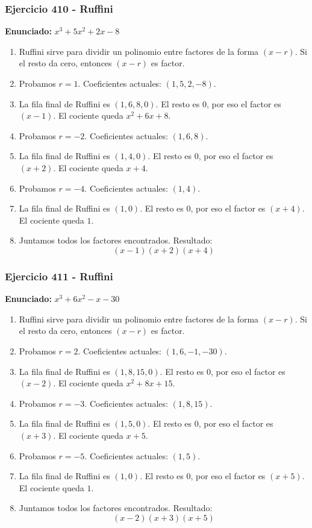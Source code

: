 \documentclass[11pt,a4paper]{article}
\begin{document}
\vspace{0.2cm}
\subsubsection*{Ejercicio 410 - Ruffini}
\textbf{Enunciado:} $ x^{3} + 5 x^{2} + 2 x - 8 $\par
\begin{enumerate}[leftmargin=2em]
\item Ruffini sirve para dividir un polinomio entre factores de la forma \((x-r)\). Si el resto da cero, entonces \((x-r)\) es factor.
\item Probamos \(r=1\). Coeficientes actuales: \((1, 5, 2, -8)\).
\item La fila final de Ruffini es \((1, 6, 8, 0)\). El resto es \(0\), por eso el factor es \((x-1)\). El cociente queda \(x^{2} + 6 x + 8\).
\item Probamos \(r=-2\). Coeficientes actuales: \((1, 6, 8)\).
\item La fila final de Ruffini es \((1, 4, 0)\). El resto es \(0\), por eso el factor es \((x+2)\). El cociente queda \(x + 4\).
\item Probamos \(r=-4\). Coeficientes actuales: \((1, 4)\).
\item La fila final de Ruffini es \((1, 0)\). El resto es \(0\), por eso el factor es \((x+4)\). El cociente queda \(1\).
\item Juntamos todos los factores encontrados. Resultado: \[\boxed{\left(x - 1\right) \left(x + 2\right) \left(x + 4\right)}\]
\end{enumerate}

\vspace{0.2cm}
\subsubsection*{Ejercicio 411 - Ruffini}
\textbf{Enunciado:} $ x^{3} + 6 x^{2} - x - 30 $\par
\begin{enumerate}[leftmargin=2em]
\item Ruffini sirve para dividir un polinomio entre factores de la forma \((x-r)\). Si el resto da cero, entonces \((x-r)\) es factor.
\item Probamos \(r=2\). Coeficientes actuales: \((1, 6, -1, -30)\).
\item La fila final de Ruffini es \((1, 8, 15, 0)\). El resto es \(0\), por eso el factor es \((x-2)\). El cociente queda \(x^{2} + 8 x + 15\).
\item Probamos \(r=-3\). Coeficientes actuales: \((1, 8, 15)\).
\item La fila final de Ruffini es \((1, 5, 0)\). El resto es \(0\), por eso el factor es \((x+3)\). El cociente queda \(x + 5\).
\item Probamos \(r=-5\). Coeficientes actuales: \((1, 5)\).
\item La fila final de Ruffini es \((1, 0)\). El resto es \(0\), por eso el factor es \((x+5)\). El cociente queda \(1\).
\item Juntamos todos los factores encontrados. Resultado: \[\boxed{\left(x - 2\right) \left(x + 3\right) \left(x + 5\right)}\]
\end{enumerate}
\end{document}
